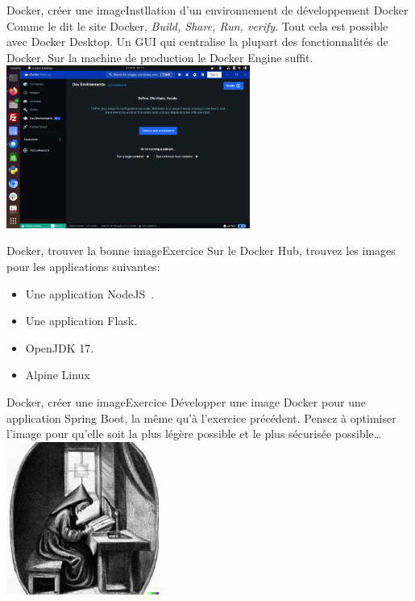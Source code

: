 \documentclass{beamer}
\begin{document}
    \begin{frame}{Docker, créer une image}{Instllation d'un environnement de développement Docker}
        Comme le dit le site Docker, \textit{Build, Share, Run, verify}.
        Tout cela est possible avec Docker Desktop.
        Un GUI qui centralise la plupart des fonctionnalités de Docker.
        \bigbreak
        Sur la machine de production le Docker Engine suffit.
        \bigbreak
        \centering
        \includegraphics[width=8cm]{image/docker-desktop}
    \end{frame}

    \begin{frame}{Docker, trouver la bonne image}{Exercice \execcounterdispinc{}}
        Sur le Docker Hub, trouvez les images pour les applications suivantes:
        \begin{itemize}
            \item Une application NodeJS~.
            \item Une application Flask.
            \item OpenJDK 17.
            \item Alpine Linux
        \end{itemize}
    \end{frame}

    \begin{frame}{Docker, créer une image}{Exercice \execcounterdispinc{}}
        Développer une image Docker pour une application Spring Boot, la même qu'à l'exercice précédent.
        \bigbreak
        Pensez à optimiser l'image pour qu'elle soit la plus légère possible et le plus sécurisée possible\ldots
        \bigbreak
        \centering
        \includegraphics[width=5cm]{image/young-studying}
    \end{frame}
\end{document}
